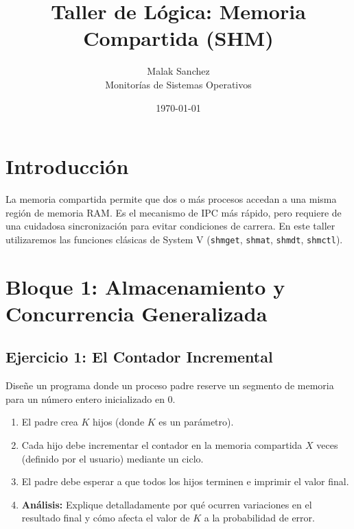 \documentclass[12pt,a4paper]{article}
\title{\textbf{Taller de Lógica: Memoria Compartida (SHM)}}
\author{Malak Sanchez \\ \small Monitorías de Sistemas Operativos}
\date{\today}
\begin{document}
\maketitle

\section*{Introducción}
La memoria compartida permite que dos o más procesos accedan a una misma región de memoria RAM. Es el mecanismo de IPC más rápido, pero requiere de una cuidadosa sincronización para evitar condiciones de carrera. En este taller utilizaremos las funciones clásicas de System V (\texttt{shmget}, \texttt{shmat}, \texttt{shmdt}, \texttt{shmctl}).

\section*{Bloque 1: Almacenamiento y Concurrencia Generalizada}

\subsection*{Ejercicio 1: El Contador Incremental}
Diseñe un programa donde un proceso padre reserve un segmento de memoria para un número entero inicializado en 0.
\begin{enumerate}
    \item El padre crea $K$ hijos (donde $K$ es un parámetro).
    \item Cada hijo debe incrementar el contador en la memoria compartida $X$ veces (definido por el usuario) mediante un ciclo.
    \item El padre debe esperar a que todos los hijos terminen e imprimir el valor final.
    \item \textbf{Análisis:} Explique detalladamente por qué ocurren variaciones en el resultado final y cómo afecta el valor de $K$ a la probabilidad de error.
\end{enumerate}

\begin{center}
\end{center}
\end{document}
